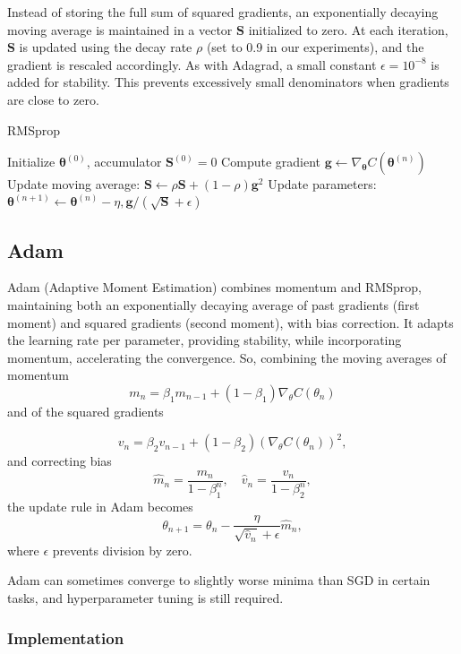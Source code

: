 \documentclass[
 reprint,            %
 amsmath,amssymb,
 aps,
]{revtex4-2}
\begin{document}
Instead of storing the full sum of squared gradients, an exponentially decaying moving average is maintained in a vector $\mathbf{S}$ initialized to zero. At each iteration, $\mathbf{S}$ is updated using the decay rate $\rho$ (set to 0.9 in our experiments), and the gradient is rescaled accordingly.
As with Adagrad, a small constant $\epsilon=10^{-8}$ is added for stability. This prevents excessively small denominators when gradients are close to zero.
\begin{algorithm}[H]
\caption{RMSprop}
\begin{algorithmic}[1]
\State Initialize $\boldsymbol{\theta}^{(0)}$, accumulator $\mathbf{S}^{(0)}=0$
\State Compute gradient $\mathbf{g} \gets \nabla_{\boldsymbol{\theta}} C(\boldsymbol{\theta}^{(n)})$
\State Update moving average: $\mathbf{S} \gets \rho \mathbf{S} + (1-\rho)\mathbf{g}^2$
\State Update parameters: $\boldsymbol{\theta}^{(n+1)} \gets \boldsymbol{\theta}^{(n)} - \eta , \mathbf{g} / (\sqrt{\mathbf{S}}+\epsilon)$
\EndFor
\end{algorithmic}
\end{algorithm}

\subsection{Adam}

Adam (Adaptive Moment Estimation) combines momentum and RMSprop, maintaining both an exponentially decaying average of past gradients (first moment) and squared gradients (second moment), with bias correction\cite{hjorthjensen_week37}. It adapts the learning rate per parameter, providing stability, while incorporating momentum, accelerating the convergence.
So, combining the moving averages of momentum
\[
m_n = \beta_1 m_{n-1} + (1-\beta_1) \nabla_\theta C(\theta_n)
\]  
and of the squared gradients

\[
v_n = \beta_2 v_{n-1} + (1-\beta_2) (\nabla_\theta C(\theta_n))^2,
\]  
and correcting bias
\[
\hat{m}_n = \frac{m_n}{1-\beta_1^n}, \quad \hat{v}_n = \frac{v_n}{1-\beta_2^n},
\]  
the update rule in Adam becomes
\[
\theta_{n+1} = \theta_n - \frac{\eta}{\sqrt{\hat{v}_n}+\epsilon} \hat{m}_n,
\]  
where \(\epsilon\) prevents division by zero.

Adam can sometimes converge to slightly worse minima than SGD in certain tasks, and hyperparameter tuning is still required. \cite{goodfellow2016}

\subsubsection{Implementation}
\end{document}
